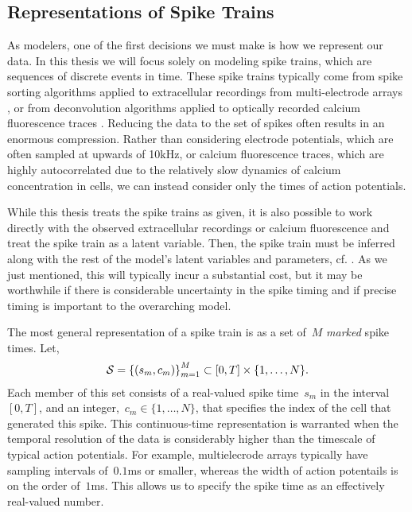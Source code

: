 \subsection{Representations of Spike Trains}
As modelers, one of the first decisions we must make is how we
represent our data. In this thesis we will focus solely on modeling
spike trains, which are sequences of discrete events in time. These
spike trains typically come from spike sorting algorithms applied to
extracellular recordings from multi-electrode arrays
\cite{lewicki1998review, quiroga2004unsupervised}, or from
deconvolution algorithms applied to optically recorded calcium
fluorescence traces \cite{pnevmatikakis2016simultaneous,
  vogelstein2010fast}. Reducing the data to the set of spikes often 
results in an enormous compression. Rather than considering electrode 
potentials, which are often sampled at upwards of 10kHz, or calcium 
fluorescence traces, which are highly autocorrelated due to the relatively 
slow dynamics of calcium concentration in cells, we can instead consider 
only the times of action potentials.

While this thesis treats the spike trains as given, it is also possible to
work directly with the observed extracellular recordings or calcium
fluorescence and treat the spike train as a latent variable.  Then,
the spike train must be inferred along with the rest of the model's
latent variables and parameters, cf. \cite{pillow2013model}. As we just 
mentioned, this will typically incur a substantial cost, but it may be 
worthwhile if there is considerable uncertainty in the spike timing 
and if precise timing is important to the overarching model.

The most general representation of a spike train is as a set of~$M$
\emph{marked} spike times.
Let,
\begin{align}
  \mathcal{S} = \left \{ (s_m, c_m) \right \}_{m=1}^M \subset [0, T] \times \{1, \ldots, N\}.
\end{align}
Each member of this set consists of a real-valued spike time~$s_m$ in
the interval~$[0, T]$, and an integer,~$c_m \in \{1, \ldots, N\}$,
that specifies the index of the cell that generated this spike. 
This continuous-time representation is
warranted when the temporal resolution of the data is considerably
higher than the timescale of typical action potentials. For example,
multielecrode arrays typically have sampling intervals of~$0.1$ms or
smaller, whereas the width of action potentails is on the order
of~$1$ms. This allows us to specify the spike time as an effectively
real-valued number.  

